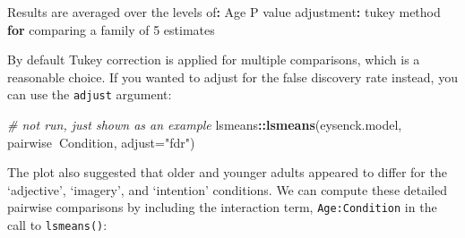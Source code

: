 \documentclass[]{article}
\newenvironment{Shaded}{\begin{snugshade}}{\end{snugshade}}
\newcommand{\CommentTok}[1]{\textcolor[rgb]{0.56,0.35,0.01}{\textit{#1}}}
\newcommand{\ControlFlowTok}[1]{\textcolor[rgb]{0.13,0.29,0.53}{\textbf{#1}}}
\newcommand{\DataTypeTok}[1]{\textcolor[rgb]{0.13,0.29,0.53}{#1}}
\newcommand{\DecValTok}[1]{\textcolor[rgb]{0.00,0.00,0.81}{#1}}
\newcommand{\KeywordTok}[1]{\textcolor[rgb]{0.13,0.29,0.53}{\textbf{#1}}}
\newcommand{\NormalTok}[1]{#1}
\newcommand{\OperatorTok}[1]{\textcolor[rgb]{0.81,0.36,0.00}{\textbf{#1}}}
\newcommand{\OtherTok}[1]{\textcolor[rgb]{0.56,0.35,0.01}{#1}}
\newcommand{\StringTok}[1]{\textcolor[rgb]{0.31,0.60,0.02}{#1}}
\begin{document}
\begin{Shaded}
\begin{Highlighting}[]
\NormalTok{Results are averaged over the levels of}\OperatorTok{:}\StringTok{ }\NormalTok{Age }
\NormalTok{P value adjustment}\OperatorTok{:}\StringTok{ }\NormalTok{tukey method }\ControlFlowTok{for}\NormalTok{ comparing a family of }\DecValTok{5}\NormalTok{ estimates }
\end{Highlighting}
\end{Shaded}

By default Tukey correction is applied for multiple comparisons, which is a
reasonable choice. If you wanted to adjust for the false discovery rate instead,
you can use the \texttt{adjust} argument:

\begin{Shaded}
\begin{Highlighting}[]
\CommentTok{# not run, just shown as an example}
\NormalTok{lsmeans}\OperatorTok{::}\KeywordTok{lsmeans}\NormalTok{(eysenck.model, pairwise}\OperatorTok{~}\NormalTok{Condition, }\DataTypeTok{adjust=}\StringTok{"fdr"}\NormalTok{)}
\end{Highlighting}
\end{Shaded}

The plot also suggested that older and younger adults appeared to differ for the
`adjective', `imagery', and `intention' conditions. We can compute these
detailed pairwise comparisons by including the interaction term, \texttt{Age:Condition}
in the call to \texttt{lsmeans()}:

\begin{Shaded}
\end{Shaded}
\end{document}
